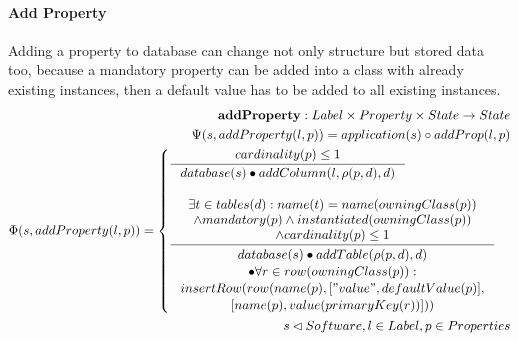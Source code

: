 \documentclass[11pt]{article}
\begin{document}
\paragraph{Add Property} Adding a property to database can change not only structure but stored data too, because a mandatory property can be added into a class with already existing instances, then a default value has to be added to all existing instances.
\begin{align*}
	\mathbf{addProperty} : Label \times Property \times State \rightarrow State \\
	\Psi(s, addProperty(l, p)) = application(s) \circ addProp(l,p) \\
	\Phi(s, addProperty(l, p)) = \begin{cases}
    		\inference{cardinality(p) \leq 1}{database(s) \bullet addColumn(l, \rho(p,d), d)} \\ \\
	    \inference{ \exists t \in tables(d) : name(t) = name(owningClass(p)) \\ \wedge mandatory(p) \wedge instantiated(owningClass(p)) \\ \wedge cardinality(p) \leq 1}{\begin{gathered}
   database(s) \bullet addTable(\rho(p,d), d) \\ \bullet \forall r \in row(owningClass(p)) :\\ insertRow(row(name(p), ["value", defaultValue(p)], \\ [name(p), value(primaryKey(r))])) 
    \end{gathered} } 
   \end{cases}\\
	s \lhd Software, l \in Label, p \in Properties
\end{align*}
\end{document}
